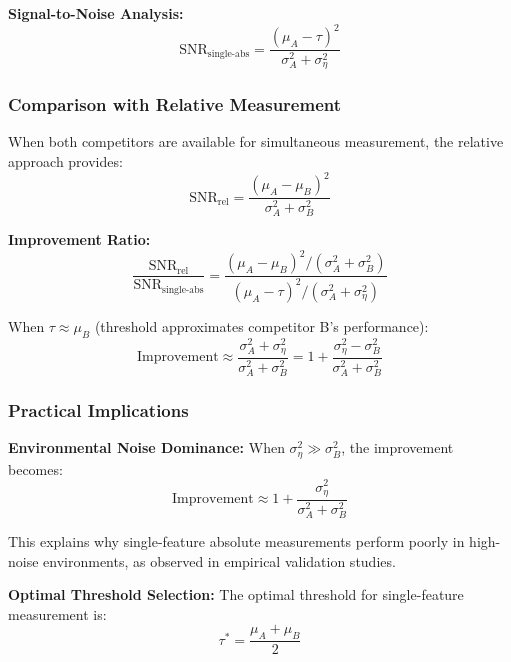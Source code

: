 \textbf{Signal-to-Noise Analysis:}
\begin{equation}
\text{SNR}_{\text{single-abs}} = \frac{(\mu_A - \tau)^2}{\sigma_A^2 + \sigma_\eta^2}
\end{equation}

\subsubsection{Comparison with Relative Measurement}

When both competitors are available for simultaneous measurement, the relative approach provides:
\begin{equation}
\text{SNR}_{\text{rel}} = \frac{(\mu_A - \mu_B)^2}{\sigma_A^2 + \sigma_B^2}
\end{equation}

\textbf{Improvement Ratio:}
\begin{equation}
\frac{\text{SNR}_{\text{rel}}}{\text{SNR}_{\text{single-abs}}} = \frac{(\mu_A - \mu_B)^2/(\sigma_A^2 + \sigma_B^2)}{(\mu_A - \tau)^2/(\sigma_A^2 + \sigma_\eta^2)}
\end{equation}

When $\tau \approx \mu_B$ (threshold approximates competitor B's performance):
\begin{equation}
\text{Improvement} \approx \frac{\sigma_A^2 + \sigma_\eta^2}{\sigma_A^2 + \sigma_B^2} = 1 + \frac{\sigma_\eta^2 - \sigma_B^2}{\sigma_A^2 + \sigma_B^2}
\end{equation}

\subsubsection{Practical Implications}

\textbf{Environmental Noise Dominance:} When $\sigma_\eta^2 \gg \sigma_B^2$, the improvement becomes:
\begin{equation}
\text{Improvement} \approx 1 + \frac{\sigma_\eta^2}{\sigma_A^2 + \sigma_B^2}
\end{equation}

This explains why single-feature absolute measurements perform poorly in high-noise environments, as observed in empirical validation studies.

\textbf{Optimal Threshold Selection:} The optimal threshold for single-feature measurement is:
\begin{equation}
\tau^* = \frac{\mu_A + \mu_B}{2}
\end{equation}

